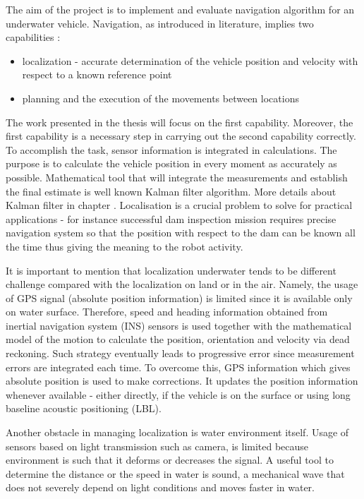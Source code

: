 The aim of the project is to implement and evaluate navigation algorithm for an underwater vehicle. Navigation, as introduced in literature, implies two capabilities \cite{farrell98}:
\begin{itemize}
\item localization - accurate determination of the vehicle position and velocity with respect to a known reference point
\item planning and the execution of the movements between locations   
\end{itemize} 
The work presented in the thesis will focus on the first capability. Moreover, the first capability is a necessary step in carrying out the second capability correctly. To accomplish the task, sensor information is integrated in calculations. The purpose is to calculate the vehicle position in every moment as accurately as possible. Mathematical tool that will integrate the measurements and establish the final estimate is well known Kalman filter \cite{kalman60} algorithm. More details about Kalman filter in chapter \label{chap:KalmanFilter}. Localisation is a crucial problem to solve for practical applications - for instance successful dam inspection mission requires precise navigation system so that the position with respect to the dam can be known all the time \cite{blain03} thus giving the meaning to the robot activity.

It is important to mention that localization underwater tends to be different challenge compared with the localization on land or in the air. Namely, the usage of GPS signal (absolute position information) is limited since it is available only on water surface. Therefore, speed and heading information obtained from inertial navigation system (INS) sensors is used together with the mathematical model of the motion to calculate the position, orientation and velocity via dead reckoning. Such strategy eventually leads to progressive error since measurement errors are integrated each time. To overcome this, GPS information which gives absolute position is used to make corrections. It updates the position information whenever available - either directly, if the vehicle is on the surface or using long baseline acoustic positioning (LBL).

Another obstacle in managing localization is water environment itself. Usage of sensors based on light transmission such as camera, is limited because environment is such that it deforms or decreases the signal. A useful tool to determine the distance or the speed in water is sound, a mechanical wave that does not severely depend on light conditions and moves faster in water.  
